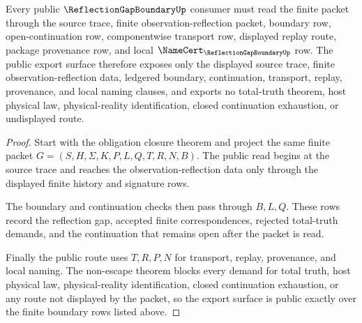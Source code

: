 \begin{theorem}
\label{thm:reflection-gap-boundary-public-export}
Every public $\ReflectionGapBoundaryUp$ consumer must read the finite packet through the source trace, finite observation-reflection packet, boundary row, open-continuation row, componentwise transport row, displayed replay route, package provenance row, and local $\NameCert_{\ReflectionGapBoundaryUp}$ row. The public export surface therefore exposes only the displayed source trace, finite observation-reflection data, ledgered boundary, continuation, transport, replay, provenance, and local naming clauses, and exports no total-truth theorem, host physical law, physical-reality identification, closed continuation exhaustion, or undisplayed route.
\end{theorem}
\begin{proof}
Start with the obligation closure theorem and project the same finite packet $G=(S,H,\Sigma,K,P,L,Q,T,R,N,B)$. The public read begins at the source trace and reaches the observation-reflection data only through the displayed finite history and signature rows.

The boundary and continuation checks then pass through $B,L,Q$. These rows record the reflection gap, accepted finite correspondences, rejected total-truth demands, and the continuation that remains open after the packet is read.

Finally the public route uses $T,R,P,N$ for transport, replay, provenance, and local naming. The non-escape theorem blocks every demand for total truth, host physical law, physical-reality identification, closed continuation exhaustion, or any route not displayed by the packet, so the export surface is public exactly over the finite boundary rows listed above.
\end{proof}


